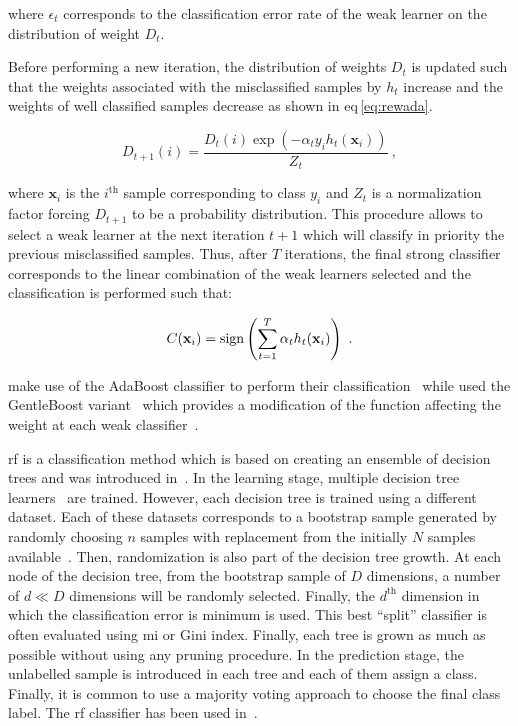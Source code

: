 \noindent where $\epsilon_t$ corresponds to the classification error rate of the weak learner on the distribution of weight $D_t$.

Before performing a new iteration, the distribution of weights $D_t$ is updated such that the weights associated with the misclassified samples by $h_t$ increase and the weights of well classified samples decrease as shown in \acs{eq}\,\eqref{eq:rewada}.

\begin{equation}
	D_{t+1}(i) = \frac{ D_t(i) \exp \left( -\alpha_t y_i h_{t}(\mathbf{x}_{i} ) \right) }{ Z_t  } \ ,
	\label{eq:rewada} 
\end{equation}

\noindent where $\mathbf{x}_i$ is the $i^{\text{th}}$ sample corresponding to class $y_i$ and $Z_t$ is a normalization factor forcing $D_{t+1}$ to be a probability distribution. 
This procedure allows to select a weak learner at the next iteration $t+1$ which will classify in priority the previous misclassified samples. 
Thus, after $T$ iterations, the final strong classifier corresponds to the linear combination of the weak learners selected and the classification is performed such that:

\begin{equation}
	C(\mathbf{x}_i) = \operatorname*{sign} \left( \sum_{t=1}^{T} \alpha_t h_t(\mathbf{x}_i) \right) \ .
	\label{eq:strclaada}
\end{equation}

\citeauthor{Lopes2011} make use of the AdaBoost classifier to perform their classification~\cite{Lopes2011} while \citeauthor{Litjens2014} used the GentleBoost variant~\cite{Friedman1998} which provides a modification of the function affecting the weight at each weak classifier~\cite{Litjens2014}.

\ac{rf} is a classification method which is based on creating an ensemble of decision trees and was introduced in~\cite{Breiman2001}.
In the learning stage, multiple decision tree learners~\cite{Breiman1984} are trained.
However, each decision tree is trained using a different dataset.
Each of these datasets corresponds to a bootstrap sample generated by randomly choosing $n$ samples with replacement from the initially $N$ samples available~\cite{Efron1979}.
Then, randomization is also part of the decision tree growth.
At each node of the decision tree, from the bootstrap sample of $D$ dimensions, a number of $d \ll D$ dimensions will be randomly selected.
Finally, the $d^{\text{th}}$ dimension in which the classification error is minimum is used.
This best ``split'' classifier is often evaluated using \ac{mi} or Gini index.
Finally, each tree is grown as much as possible without using any pruning procedure.
In the prediction stage, the unlabelled sample is introduced in each tree and each of them assign a class.
Finally, it is common to use a majority voting approach to choose the final class label.
The \ac{rf} classifier has been used in~\cite{Kelm2007,Litjens2014,Tiwari2012,Tiwari2013,Viswanath2009,trigui2017automatic,trigui2016classification,samarasinghe2016semi,rampun2015classifying,rampun2016computerb,rampun2015computer,rampun2016computer}.

